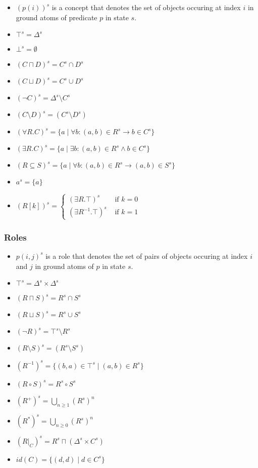 \documentclass{article}
\begin{document}
\begin{itemize}
    \item $(p(i))^s$ is a concept that denotes the set of
    objects occuring at index $i$ in ground atoms of predicate $p$ in state $s$.
    \item $\top^s = \Delta^s$
    \item $\bot^s = \emptyset$
    \item $(C\sqcap D)^s = C^s\cap D^s$
    \item $(C\sqcup D)^s = C^s\cup D^s$
    \item $(\neg C)^s = \Delta^s\setminus C^s$
    \item $(C\setminus D)^s = (C^s\setminus D^s)$
    \item $(\forall R.C)^s = \{a\mid\forall b:(a,b)\in R^s\rightarrow b\in C^s\}$
    \item $(\exists R.C)^s = \{a\mid\exists b:(a,b)\in R^s\land b\in C^s\}$
    \item $(R\subseteq S)^s = \{a\mid\forall b:(a,b)\in R^s\rightarrow (a,b)\in S^s\}$
    \item $a^s = \{a\}$
    \item $(R[k])^s = \begin{cases}(\exists R.\top)^s & \text{ if } k = 0\\ (\exists R^{-1}.\top)^s & \text{ if } k = 1 \end{cases}$
\end{itemize}

\subsubsection{Roles}

\begin{itemize}
    \item $p(i,j)^s$ is a role that denotes the set of pairs of
    objects occuring at index $i$ and $j$ in ground atoms of $p$ in state $s$.
    \item $\top^s = \Delta^s\times\Delta^s$
    \item $(R\sqcap S)^s = R^s\cap S^s$
    \item $(R\sqcup S)^s = R^s\cup S^s$
    \item $(\neg R)^s = \top^s\setminus R^s$
    \item $(R\setminus S)^s = (R^s\setminus S^s)$
    \item $(R^{-1})^s = \{(b,a)\in\top^s\mid (a,b)\in R^s\}$
    \item $(R\circ S)^s = R^s\circ S^s$
    \item $(R^+)^s = \bigcup_{n\geq 1}(R^s)^n$
    \item $(R^*)^s = \bigcup_{n\geq 0}(R^s)^n$
    \item $(R\vert_{C})^s = R^s\sqcap (\Delta^s\times C^s)$
    \item $\mathit{id}(C) = \{(d,d)\mid d\in C^s \}$
\end{itemize}
\end{document}
